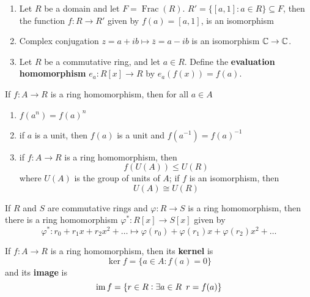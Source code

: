 \documentclass[11pt]{article}
\DeclareMathOperator{\Frac}{Frac}
\begin{document}
\begin{examplle}[]
\begin{enumerate}
\item Let \(R\) be a domain and let \(F=\Frac(R)\). 
\(R'=\{[a,1]:a\in R\}\subseteq F\), then the function \(f:R\to R'\) given
by \(f(a)=[a,1]\), is an isomorphism
\item Complex conjugation \(z=a+ib\mapsto\overline{z}=a-ib\) is an isomorphism
\(\mathbb{C}\to \mathbb{C}\).
\item Let \(R\) be a commutative ring, and let \(a\in R\). Define the \textbf{evaluation
homomorphism} \(e_a:R[x]\to R\) by \(e_a(f(x))=f(a)\).
\end{enumerate}
\end{examplle}

\begin{lemma}[]
If \(f:A\to R\) is a ring homomorphism, then for all \(a\in A\)
\begin{enumerate}
\item \(f(a^n)=f(a)^n\)
\item if \(a\) is a unit, then \(f(a)\) is a unit and \(f(a^{-1})=f(a)^{-1}\)
\item if \(f:A\to R\) is a ring homomorphism, then
\begin{equation*}
f(U(A))\le U(R)
\end{equation*}
where \(U(A)\) is the group of units of \(A\); if \(f\) is an isomorphism,
then
\begin{equation*}
U(A)\cong U(R)
\end{equation*}
\end{enumerate}
\end{lemma}

\begin{proposition}[]
If \(R\) and \(S\) are commutative rings and \(\varphi:R\to S\) is a ring
homomorphism, then there is a ring homomorphism \(\varphi^*:R[x]\to S[x]\)
given by
\begin{equation*}
\varphi^*:r_0+r_1x+r_2x^2+\dots\mapsto\varphi(r_0)+\varphi(r_1)x+
\varphi(r_2)x^2+\dots
\end{equation*}
\end{proposition}

\begin{definition}[]
If \(f:A\to R\) is a ring homomorphism, then its \textbf{kernel} is
\begin{equation*}
\ker f=\{a\in A:f(a)=0\}
\end{equation*}
and its \textbf{image} is 
\begin{equation*}
\operatorname{im} f=\{r\in R:\exists a\in R\enspace r=f(a)\}
\end{equation*}
\end{definition}
\end{document}

